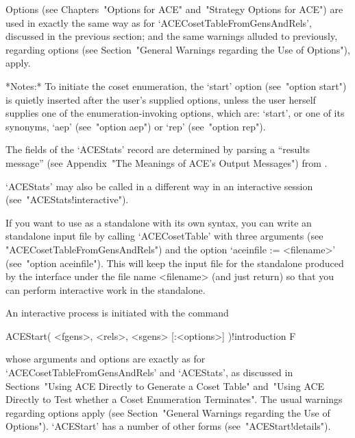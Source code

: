 \enditems

Options (see Chapters~"Options  for  ACE"  and~"Strategy  Options  for
ACE")   are   used    in    exactly    the    same    way    as    for
`ACECosetTableFromGensAndRels', discussed in the previous section; and
the same  warnings  alluded  to  previously,  regarding  options  (see
Section~"General Warnings regarding the Use of Options"), apply.

*Notes:*
To initiate the coset enumeration,  the  `start'  option  (see~"option
start") is quietly inserted after the user's supplied options,  unless
the user herself supplies one  of  the  enumeration-invoking  options,
which are: `start', or one of its synonyms, `aep'  (see~"option  aep")
or `rep' (see~"option rep").

The fields of the  `ACEStats'  record  are  determined  by  parsing  a
``results  message''  (see  Appendix~"The  Meanings  of  ACE's  Output
Messages") from {\ACE}.

`ACEStats' may also be called in a different  way  in  an  interactive
{\ACE} session (see~"ACEStats!interactive").


If you want to use {\ACE} as a standalone with its own syntax, you can
write an {\ACE} standalone input file by calling `ACECosetTable'  with
three arguments (see "ACECosetTableFromGensAndRels")  and  the  option
`aceinfile := <filename>' (see~"option aceinfile"). This will keep the
input file for the {\ACE} standalone produced by the {\GAP}  interface
under the file name <filename> (and  just  return)  so  that  you  can
perform interactive work in the standalone.


An interactive {\ACE} process is initiated with the command

\>ACEStart( <fgens>, <rels>, <sgens> [:<options>] )!{introduction} F

whose    arguments    and    options    are     exactly     as     for
`ACECosetTableFromGensAndRels'  and  `ACEStats',   as   discussed   in
Sections~"Using ACE Directly to Generate a Coset Table" and~"Using ACE
Directly to Test whether a Coset Enumeration  Terminates".  The  usual
warnings  regarding  options  apply  (see  Section~"General   Warnings
regarding the Use of Options"). `ACEStart' has a number of other forms
(see~"ACEStart!details").

